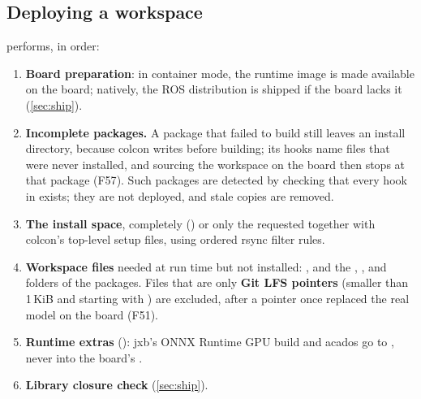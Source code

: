 \documentclass[11pt,a4paper]{article}
\newcommand{\jxb}{\textsf{jxb}}
\newcommand{\finding}[1]{\textsf{\small F#1}}
\begin{document}
\subsection{Deploying a workspace}
 performs, in order:
\begin{enumerate}
  \item \textbf{Board preparation}: in container mode, the runtime image is made available on the board; natively, the
        ROS distribution is shipped if the board lacks it (\cref{sec:ship}).
  \item \textbf{Incomplete packages.} A package that failed to build still leaves an install directory, because colcon
        writes  before building; its hooks name  files that were
        never installed, and sourcing the workspace on the board then stops at that package (\finding{57}). Such
        packages are detected by checking that every  hook in  exists; they are not
        deployed, and stale copies are removed.
  \item \textbf{The install space}, completely () or only the requested  together
        with colcon's top-level setup files, using ordered rsync filter rules.
  \item \textbf{Workspace files} needed at run time but not installed: ,  and the
        , ,  and  folders of the packages. Files that are only
        \textbf{Git LFS pointers} (smaller than 1\,KiB and starting with )
        are excluded, after a pointer once replaced the real model on the board (\finding{51}).
  \item \textbf{Runtime extras} (): \jxb's ONNX Runtime GPU build and acados go to
        , never into the board's .
  \item \textbf{Library closure check} (\cref{sec:ship}).
\end{enumerate}
\end{document}
